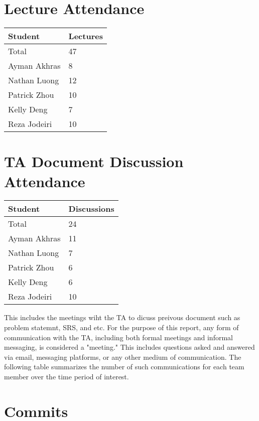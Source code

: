 \documentclass{article}
\begin{document}
\section{Lecture Attendance}

\begin{table}[H]
\centering
\begin{tabular}{ll}
\toprule
\textbf{Student} & \textbf{Lectures}\\
\midrule
Total & 47\\
Ayman Akhras & 8\\
Nathan Luong & 12\\
Patrick Zhou & 10\\
Kelly Deng & 7\\
Reza Jodeiri & 10\\
\bottomrule
\end{tabular}
\end{table}


\section{TA Document Discussion Attendance}

\begin{table}[H]
\centering
\begin{tabular}{ll}
\toprule
\textbf{Student} & \textbf{Discussions}\\
\midrule
Total & 24\\
Ayman Akhras & 11\\
Nathan Luong & 7\\
Patrick Zhou & 6\\
Kelly Deng & 6\\
Reza Jodeiri & 10\\
\bottomrule
\end{tabular}
\end{table}

This includes the meetings wiht the TA to dicuss preivous document such as problem statemnt, SRS, and etc.
For the purpose of this report, any form of communication with the TA, including both formal meetings and informal messaging, is considered a "meeting." This includes questions asked and answered via email, messaging platforms, or any other medium of communication. The following table summarizes the number of such communications for each team member over the time period of interest.

\section{Commits}
\end{document}
